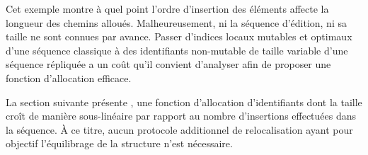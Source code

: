 Cet exemple montre à quel point l'ordre d'insertion des éléments affecte la
longueur des chemins alloués. Malheureusement, ni la séquence d'édition, ni sa
taille ne sont connues par avance.  Passer d'indices locaux mutables et optimaux
d'une séquence classique à des identifiants non-mutable de taille variable d'une
séquence répliquée a un coût qu'il convient d'analyser afin de proposer une
fonction d'allocation efficace.

La section suivante présente \LSEQ, une fonction d'allocation d'identifiants
dont la taille croît de manière sous-linéaire par rapport au nombre d'insertions
effectuées dans la séquence. À ce titre, aucun protocole additionnel de
relocalisation ayant pour objectif l'équilibrage de la structure n'est
nécessaire.


